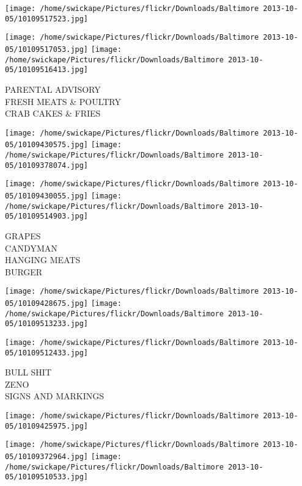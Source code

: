 \documentclass[10pt,letterpaper]{article}
\begin{document}
\texttt{[image: /home/swickape/Pictures/flickr/Downloads/Baltimore 2013-10-05/10109517523.jpg]}

\vspace{0.25in}
\texttt{[image: /home/swickape/Pictures/flickr/Downloads/Baltimore 2013-10-05/10109517053.jpg]}
\texttt{[image: /home/swickape/Pictures/flickr/Downloads/Baltimore 2013-10-05/10109516413.jpg]}

PARENTAL ADVISORY\\
FRESH MEATS \& POULTRY\\
CRAB CAKES \& FRIES\\
\pagebreak

\texttt{[image: /home/swickape/Pictures/flickr/Downloads/Baltimore 2013-10-05/10109430575.jpg]}
\texttt{[image: /home/swickape/Pictures/flickr/Downloads/Baltimore 2013-10-05/10109378074.jpg]}

\texttt{[image: /home/swickape/Pictures/flickr/Downloads/Baltimore 2013-10-05/10109430055.jpg]}
\texttt{[image: /home/swickape/Pictures/flickr/Downloads/Baltimore 2013-10-05/10109514903.jpg]}

GRAPES\\
CANDYMAN\\
HANGING MEATS\\
BURGER\\
\pagebreak

\texttt{[image: /home/swickape/Pictures/flickr/Downloads/Baltimore 2013-10-05/10109428675.jpg]}
\texttt{[image: /home/swickape/Pictures/flickr/Downloads/Baltimore 2013-10-05/10109513233.jpg]}

\texttt{[image: /home/swickape/Pictures/flickr/Downloads/Baltimore 2013-10-05/10109512433.jpg]}

BULL SHIT\\
ZENO\\
SIGNS AND MARKINGS\\
\pagebreak

\texttt{[image: /home/swickape/Pictures/flickr/Downloads/Baltimore 2013-10-05/10109425975.jpg]}

\vspace{0.25in}
\texttt{[image: /home/swickape/Pictures/flickr/Downloads/Baltimore 2013-10-05/10109372964.jpg]}
\texttt{[image: /home/swickape/Pictures/flickr/Downloads/Baltimore 2013-10-05/10109510533.jpg]}
\end{document}
